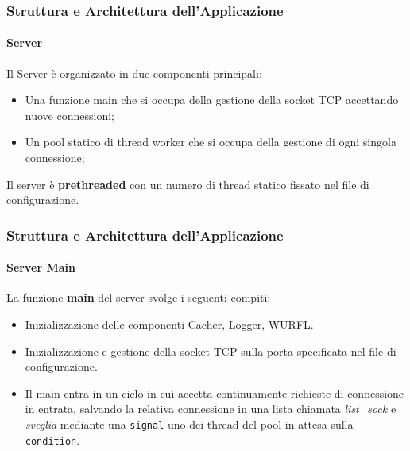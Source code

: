 \documentclass{beamer}
\begin{document}
\begin{frame}
\frametitle{Struttura e Architettura dell'Applicazione}
\framesubtitle{Server}

Il Server è organizzato in due componenti principali:
\begin{itemize}
\item Una funzione main che si occupa della gestione della socket TCP
accettando nuove connessioni;
\item Un pool statico di thread worker che si occupa della gestione di ogni
singola connessione;
\end{itemize}


Il server è \textbf{prethreaded} con  un numero di thread statico fissato nel file di configurazione.


\medskip
\end{frame}

\begin{frame}
\frametitle{Struttura e Architettura dell'Applicazione}
\framesubtitle{Server Main}
La funzione \textbf{main} del server svolge i seguenti compiti:

\medskip

\begin{itemize}
\item Inizializzazione delle componenti Cacher, Logger, WURFL.
\item Inizializzazione e gestione della socket TCP sulla porta specificata nel file di configurazione.
\item Il main entra in un ciclo in cui accetta continuamente richieste di connessione in entrata, salvando la relativa connessione in una lista chiamata \textit{list\_sock} e \textit{sveglia} mediante una \texttt{signal} uno dei thread del pool in attesa sulla \texttt{condition}.
\end{itemize}

\end{frame}
\end{document}

